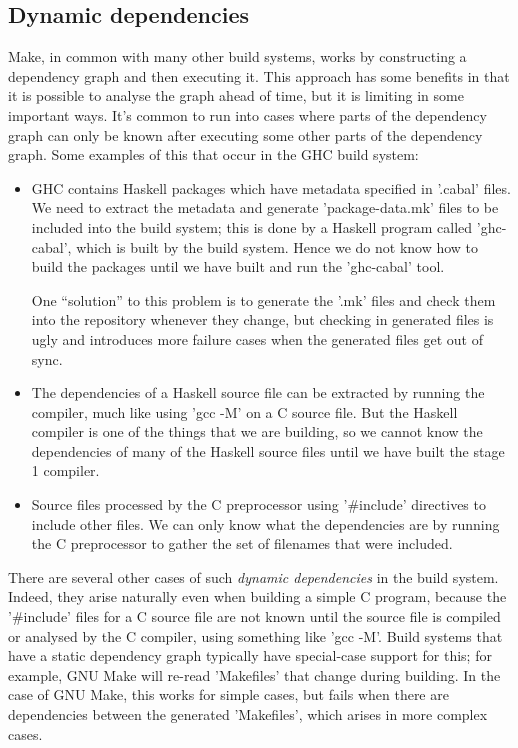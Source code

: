 \subsection{Dynamic dependencies\label{sec:dynamic-deps}}


Make, in common with many other build systems, works by
constructing a dependency graph and then executing it. This approach
has some benefits in that it is possible to analyse the graph ahead of
time, but it is limiting in some important ways.  It's common to run
into cases where parts of the dependency graph can only be known after
executing some other parts of the dependency graph.  Some examples of
this that occur in the GHC build system:

\begin{itemize}
\item GHC contains Haskell packages which have metadata specified in
  \lst'.cabal' files. We need to extract the metadata and generate
  \lst'package-data.mk' files to be included into the build system; this
  is done by a Haskell program called \lst'ghc-cabal', which is built by the
  build system. Hence we do not know how to build the packages until we have
  built and run the \lst'ghc-cabal' tool.

  One ``solution'' to this problem is to generate the \lst'.mk'
  files and check them into the repository whenever they change, but
  checking in generated files is ugly and introduces more failure
  cases when the generated files get out of sync.

\item The dependencies of a Haskell source file can be extracted by
  running the compiler, much like using \lst'gcc -M' on a C source
  file.  But the Haskell compiler is one of the things that we are
  building, so we cannot know the dependencies of many of the Haskell
  source files until we have built the stage 1 compiler.

\item Source files processed by the C preprocessor using
  \lst'#include' directives to include other files.  We can only
  know what the dependencies are by running the C preprocessor to
  gather the set of filenames that were included.
\end{itemize}

There are several other cases of such \emph{dynamic dependencies} in the build
system. Indeed, they arise naturally even when building a simple C program,
because the \lst'#include' files for a C source file are not known until the
source file is compiled or analysed by the C compiler, using something like
\lst'gcc -M'. Build systems that have a static dependency graph typically have
special-case support for this; for example, GNU Make will re-read
\lst'Makefiles' that change during building.  In the case of GNU Make,
this works for simple cases, but fails when there are dependencies
between the generated \lst'Makefiles', which arises in more complex cases.

